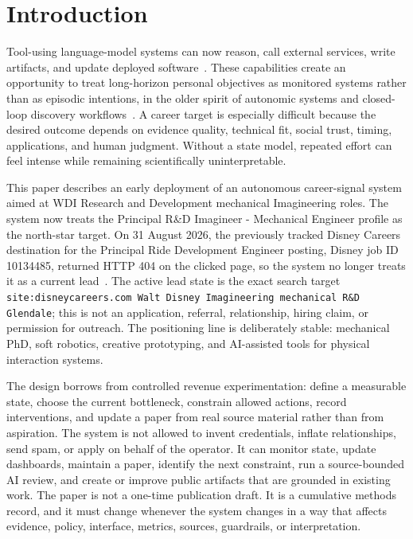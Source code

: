 \documentclass[12pt,letterpaper]{article}
\begin{document}
\newpage
\pagestyle{fancy}

\section{Introduction}

Tool-using language-model systems can now reason, call external services, write artifacts, and update deployed software~\cite{yao_react_2023,schick_toolformer_2023,wu_autogen_2023,wang_survey_2023}. These capabilities create an opportunity to treat long-horizon personal objectives as monitored systems rather than as episodic intentions, in the older spirit of autonomic systems and closed-loop discovery workflows~\cite{kephart_vision_2003,kusne_closed_loop_2020}. A career target is especially difficult because the desired outcome depends on evidence quality, technical fit, social trust, timing, applications, and human judgment. Without a state model, repeated effort can feel intense while remaining scientifically uninterpretable.

This paper describes an early deployment of an autonomous career-signal system aimed at WDI Research and Development mechanical Imagineering roles. The system now treats the Principal R\&D Imagineer - Mechanical Engineer profile as the north-star target. On 31 August 2026, the previously tracked Disney Careers destination for the Principal Ride Development Engineer posting, Disney job ID 10134485, returned HTTP 404 on the clicked page, so the system no longer treats it as a current lead~\cite{disney_wdi_mechanical_2026}. The active lead state is the exact search target \texttt{site:disneycareers.com Walt Disney Imagineering mechanical R\&D Glendale}; this is not an application, referral, relationship, hiring claim, or permission for outreach. The positioning line is deliberately stable: mechanical PhD, soft robotics, creative prototyping, and AI-assisted tools for physical interaction systems.

The design borrows from controlled revenue experimentation: define a measurable state, choose the current bottleneck, constrain allowed actions, record interventions, and update a paper from real source material rather than from aspiration. The system is not allowed to invent credentials, inflate relationships, send spam, or apply on behalf of the operator. It can monitor state, update dashboards, maintain a paper, identify the next constraint, run a source-bounded AI review, and create or improve public artifacts that are grounded in existing work. The paper is not a one-time publication draft. It is a cumulative methods record, and it must change whenever the system changes in a way that affects evidence, policy, interface, metrics, sources, guardrails, or interpretation.
\end{document}
